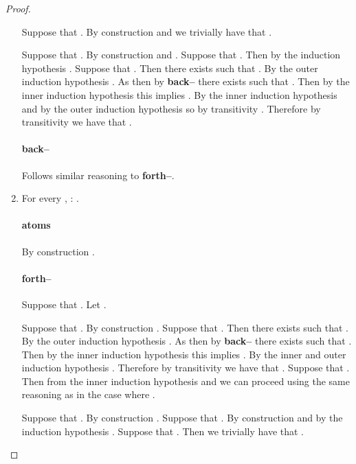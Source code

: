 \documentclass[twoside]{aiml14}
\begin{document}
\begin{proof}
\begin{enumerate}
              Suppose that .
              By construction  
              and we trivially have that .

              Suppose that .
              By construction  and . 
              Suppose that . 
              Then by the induction hypothesis .
              Suppose that . 
              Then there exists  
              such that .
              By the outer induction hypothesis .
              As  then by {\bf back--}
              there exists 
              such that .
              Then by the inner induction hypothesis this implies .
              By the inner induction hypothesis  
              and by the outer induction hypothesis  
              so by transitivity .
              Therefore by transitivity we have that .

              \paragraph{back--} Follows similar reasoning to {\bf forth--}.

          \item 
              For every , : .

              \paragraph{atoms} By construction .

              \paragraph{forth--} Suppose that . Let . 

              Suppose that .
              By construction . 
              Suppose that .
              Then there exists  such that .
              By the outer induction hypothesis .
              As  then by {\bf back--}
              there exists 
              such that .
              Then by the inner induction hypothesis this implies .
              By the inner and outer induction hypothesis .
              Therefore by transitivity we have that .
              Suppose that . 
              Then from the inner induction hypothesis  
              and we can proceed using the same reasoning as in the case where .

              Suppose that .
              By construction . 
              Suppose that .
              By construction 
              and by the induction hypothesis .
              Suppose that .
              Then we trivially have that .


\end{enumerate}
\end{proof}
\end{document}
